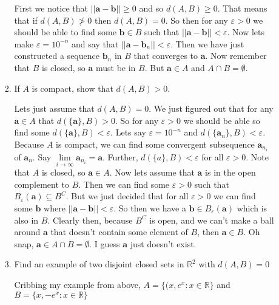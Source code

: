 \documentclass[letterpaper]{article}
\begin{document}
\begin{enumerate}
\begin{enumerate}
\begin{enumerate}
      First we notice that $||\boldsymbol{a}-\boldsymbol{b}||\ge 0$ and so $d(A,B)\ge 0$.
      That means that if $d(A,B)\not>0$ then $d(A,B)=0$.
      So then for any $\varepsilon>0$ we should be able to find some $\boldsymbol{b}\in B$ such that $||\boldsymbol{a}-\boldsymbol{b}||<\varepsilon$.
      Now lets make $\varepsilon=10^{-n}$ and say that $||\boldsymbol{a}-\boldsymbol{b}_n||<\varepsilon$.
      Then we have just constructed a sequence $\boldsymbol{b}_n$ in $B$ that converges to $\boldsymbol{a}$.
      Now remember that $B$ is closed, so $\boldsymbol{a}$ must be in $B$.
      But $\boldsymbol{a}\in A$ and $A\cap B=\emptyset$.
    \item
      If $A$ is compact, show that $d(A,B)>0$.

      Lets just assume that $d(A,B)=0$.
      We just figured out that for any $\boldsymbol{a}\in A$ that $d(\{\boldsymbol{a}\},B)>0$.
      So for any $\varepsilon>0$ we should be able so find some $d(\{\boldsymbol{a}\},B)<\varepsilon$.
      Lets say $\varepsilon=10^{-n}$ and $d(\{\boldsymbol{a}_n\},B)<\varepsilon$.
      Because $A$ is compact, we can find some convergent subsequence $\boldsymbol{a}_{n_i}$ of $\boldsymbol{a}_n$.
      Say $\lim\limits_{i\to\infty}\boldsymbol{a}_{n_i}=\boldsymbol{a}$.
      Further, $d(\{a\},B)<\varepsilon$ for all $\varepsilon>0$.
      Note that $A$ is closed, so $\boldsymbol{a}\in A$.
      Now lets assume that $\boldsymbol{a}$ is in the open complement to $B$.
      Then we can find some $\varepsilon>0$ such that $B_\varepsilon(\boldsymbol{a})\subseteq B^C$.
      But we just decided that for all $\varepsilon>0$ we can find some $\boldsymbol{b}$ where $||\boldsymbol{a}-\boldsymbol{b}||<\varepsilon$.
      So then we have a $\boldsymbol{b}\in B_\varepsilon(\boldsymbol{a})$ which is also in $B$.
      Clearly then, because $B^C$ is open, and we can't make a ball around $\boldsymbol{a}$ that doesn't contain some element of $B$, then $\boldsymbol{a}\in B$.
      Oh snap, $\boldsymbol{a}\in A\cap B=\emptyset$.
      I guess $\boldsymbol{a}$ just doesn't exist.
    \item
      Find an example of two disjoint closed sets in $\mathbb{R}^2$ with $d(A,B)=0$

      Cribbing my example from above, $A=\{(x,e^x:x\in \mathbb{R}\}$ and $B=\{x,-e^{x}:x\in \mathbb{R}\}$
    \end{enumerate}
  \end{enumerate}
\end{enumerate}
\end{document}
